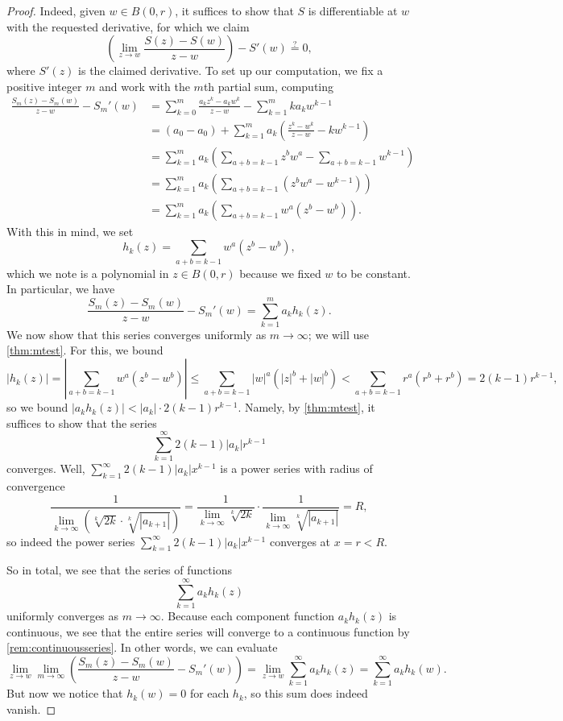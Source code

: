 \documentclass[../notes.tex]{subfiles}
\begin{document}
\begin{proof}
	Indeed, given $w\in B(0,r)$, it suffices to show that $S$ is differentiable at $w$ with the requested derivative, for which we claim
	\[\left(\lim_{z\to w}\frac{S(z)-S(w)}{z-w}\right)-S'(w)\stackrel?=0,\]
	where $S'(z)$ is the claimed derivative. To set up our computation, we fix a positive integer $m$ and work with the $m$th partial sum, computing
	\begin{align*}
		\frac{S_m(z)-S_m(w)}{z-w}-S_m'(w) &= \sum_{k=0}^m\frac{a_kz^k-a_kw^k}{z-w}-\sum_{k=1}^mka_kw^{k-1} \\
		&= (a_0-a_0)+\sum_{k=1}^ma_k\left(\frac{z^k-w^k}{z-w}-kw^{k-1}\right) \\
		&= \sum_{k=1}^ma_k\left(\sum_{a+b=k-1}z^bw^a-\sum_{a+b=k-1}w^{k-1}\right) \\
		&= \sum_{k=1}^ma_k\left(\sum_{a+b=k-1}\left(z^bw^a-w^{k-1}\right)\right) \\
		&= \sum_{k=1}^ma_k\left(\sum_{a+b=k-1}w^a\left(z^b-w^b\right)\right).
	\end{align*}
	With this in mind, we set
	\[h_k(z)=\sum_{a+b=k-1}w^a\left(z^b-w^b\right),\]
	which we note is a polynomial in $z\in B(0,r)$ because we fixed $w$ to be constant. In particular, we have
	\[\frac{S_m(z)-S_m(w)}{z-w}-S_m'(w)=\sum_{k=1}^ma_kh_k(z).\]
	We now show that this series converges uniformly as $m\to\infty$; we will use \autoref{thm:mtest}. For this, we bound
	\[|h_k(z)|=\left|\sum_{a+b=k-1}w^a\left(z^b-w^b\right)\right|\le\sum_{a+b=k-1}|w|^a\left(|z|^b+|w|^b\right)<\sum_{a+b=k-1}r^a\left(r^b+r^b\right)=2(k-1)r^{k-1},\]
	so we bound $|a_kh_k(z)|<|a_k|\cdot2(k-1)r^{k-1}$. Namely, by \autoref{thm:mtest}, it suffices to show that the series
	\[\sum_{k=1}^\infty2(k-1)|a_k|r^{k-1}\]
	converges. Well, $\sum_{k=1}^\infty2(k-1)|a_k|x^{k-1}$ is a power series with radius of convergence
	\[\frac1{\lim_{k\to\infty}\left(\sqrt[k]{2k}\cdot\sqrt[k]{|a_{k+1}|}\right)}=\frac1{\lim_{k\to\infty}\sqrt[k]{2k}}\cdot\frac1{\lim_{k\to\infty}\sqrt[k]{|a_{k+1}|}}=R,\]
	so indeed the power series $\sum_{k=1}^\infty2(k-1)|a_k|x^{k-1}$ converges at $x=r<R$.

	So in total, we see that the series of functions
	\[\sum_{k=1}^\infty a_kh_k(z)\]
	uniformly converges as $m\to\infty$. Because each component function $a_kh_k(z)$ is continuous, we see that the entire series will converge to a continuous function by \autoref{rem:continuousseries}. In other words, we can evaluate
	\[\lim_{z\to w}\lim_{m\to\infty}\left(\frac{S_m(z)-S_m(w)}{z-w}-S_m'(w)\right)=\lim_{z\to w}\sum_{k=1}^\infty a_kh_k(z)=\sum_{k=1}^\infty a_kh_k(w).\]
	But now we notice that $h_k(w)=0$ for each $h_k$, so this sum does indeed vanish.


\end{proof}
\end{document}
